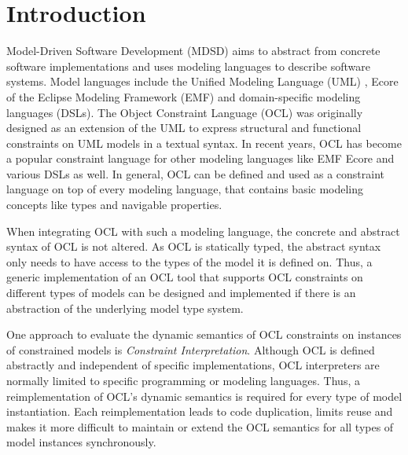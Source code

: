 \section{Introduction}

Model-Driven Software Development (MDSD) aims to abstract from concrete software implementations and uses modeling languages to describe software systems. Model languages include the Unified Modeling Language (UML) \cite{spec:UML2-2}, Ecore of the Eclipse Modeling Framework (EMF) \cite{WWW:EMF} and domain-specific modeling languages (DSLs). The Object Constraint Language (OCL) \cite{spec:OCL2-2} was originally designed as an extension of the UML to express structural and functional constraints on UML models in a textual syntax. In recent years, OCL has become a popular constraint language for other modeling languages like EMF Ecore and various DSLs as well. In general, OCL can be defined and used as a constraint language on top of every modeling language, that contains basic modeling concepts like types and navigable properties.

When integrating OCL with such a modeling language, the concrete and abstract syntax of OCL is not altered. As OCL is statically typed, the abstract syntax only needs to have access to the types of the model it is defined on. Thus, a generic implementation of an OCL tool that supports OCL constraints on different types of models can be designed and implemented if there is an abstraction of the underlying model type system. %

One approach to evaluate the dynamic semantics of OCL constraints on instances of constrained models is \textit{Constraint Interpretation}. Although OCL is defined abstractly and independent of specific implementations, %
OCL interpreters are normally limited to specific programming or modeling languages. Thus, a reimplementation of OCL's dynamic semantics is required for every type of model instantiation. Each reimplementation leads to code duplication, limits reuse and makes it more difficult to maintain or extend the OCL semantics for all types of model instances synchronously.

